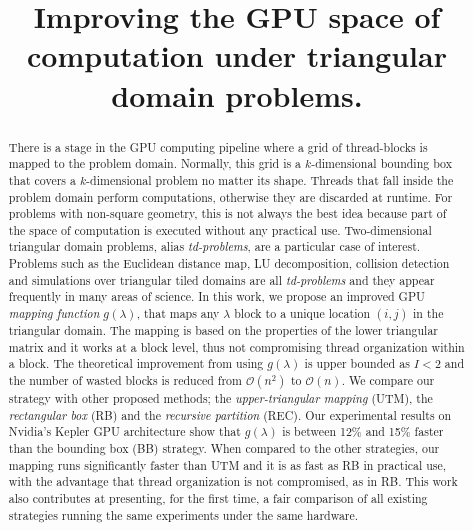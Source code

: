 \documentclass[conference]{IEEEtran}
\begin{document}
\title{Improving the GPU space of computation under triangular domain problems.}

\author{
\and
{}
}


\maketitle
\begin{abstract}
There is a stage in the GPU computing pipeline where a grid of thread-blocks is mapped to the problem domain. 
Normally, this grid is a $k$-dimensional bounding box that covers a $k$-dimensional problem no matter its shape. Threads that 
fall inside the problem domain perform computations, otherwise they are discarded at runtime.
For problems with non-square geometry, this is not always the best idea because part of the space of computation is executed without any practical use.
Two-dimensional triangular domain problems, alias \textit{td-problems}, are a particular case of interest. 
Problems such as the Euclidean distance map, LU decomposition, collision detection and simulations over triangular tiled domains are all \textit{td-problems} and they appear frequently in many 
areas of science. 
In this work, we propose an improved GPU \textit{mapping function} $g(\lambda)$, that maps any $\lambda$ block to a unique location $(i,j)$ in the triangular domain.
The mapping is based on the properties of the lower triangular matrix and it works at a block level, thus not compromising thread organization within a block. 
The theoretical improvement from using $g(\lambda)$ is upper bounded as $I < 2$ and the number of wasted blocks is reduced from $\mathcal{O}(n^2)$ to $\mathcal{O}(n)$. 
We compare our strategy with other proposed methods; the \textit{upper-triangular mapping} (UTM), the \textit{rectangular box} (RB) and the \textit{recursive partition} (REC). 
Our experimental results on Nvidia's Kepler GPU architecture show that $g(\lambda)$ is between 12\% and 15\% faster than the bounding box (BB) strategy. When compared to the other strategies, 
our mapping runs significantly faster than UTM and it is as fast as RB in practical use, with the advantage that thread organization is not compromised, as in RB. This work also contributes at presenting, 
for the first time, a fair comparison of all existing strategies running the same experiments under the same hardware.
\end{abstract}
\end{document}
